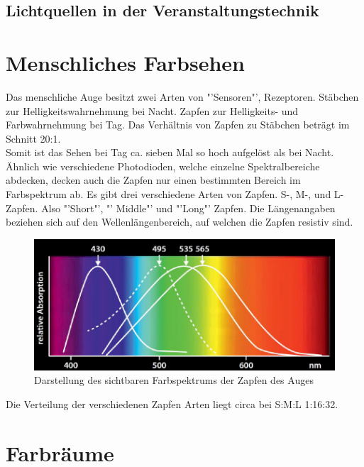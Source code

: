 \documentclass[11pt]{scrartcl}
\begin{document}
\subsection{Lichtquellen in der Veranstaltungstechnik}
\clearpage

\section{Menschliches Farbsehen}
Das menschliche Auge besitzt zwei Arten von "'Sensoren"', Rezeptoren. Stäbchen zur Helligkeitswahrnehmung bei Nacht.
Zapfen zur Helligkeits- und Farbwahrnehmung bei Tag. Das Verhältnis von Zapfen zu Stäbchen beträgt im Schnitt 20:1.\\
Somit ist das Sehen bei Tag ca. sieben Mal so hoch aufgelöst als bei Nacht.\\
Ähnlich wie verschiedene Photodioden, welche einzelne Spektralbereiche abdecken, decken auch die Zapfen nur einen
bestimmten Bereich im Farbspektrum ab. Es gibt drei verschiedene Arten von Zapfen. S-, M-, und L-Zapfen. Also "'Short"',
"' Middle"' und "'Long"' Zapfen. Die Längenangaben beziehen sich auf den Wellenlängenbereich, auf welchen die Zapfen
resistiv sind.\\
\begin{figure}[H]
    \includegraphics[width=\textwidth]{images/eye_spectrum.png}
    \caption{Darstellung des sichtbaren Farbspektrums der Zapfen des Auges}
\end{figure}
Die Verteilung der verschiedenen Zapfen Arten liegt circa bei S:M:L 1:16:32.
\clearpage

\section{Farbräume}
\end{document}
